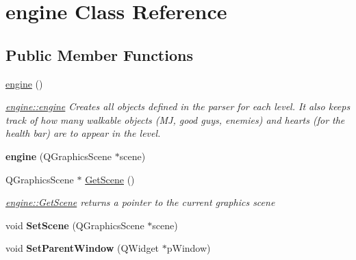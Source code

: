 \hypertarget{classengine}{\section{engine Class Reference}
\label{classengine}
}
\subsection*{Public Member Functions}
\begin{DoxyCompactItemize}
\item 
\hypertarget{classengine_aaffbfa4e20b4b627f2336eb6b40db348}{\hyperlink{classengine_aaffbfa4e20b4b627f2336eb6b40db348}{engine} ()}\label{classengine_aaffbfa4e20b4b627f2336eb6b40db348}

\begin{DoxyCompactList}\small\item\em \hyperlink{classengine_aaffbfa4e20b4b627f2336eb6b40db348}{engine\-::engine} Creates all objects defined in the parser for each level. It also keeps track of how many walkable objects (M\-J, good guys, enemies) and hearts (for the health bar) are to appear in the level. \end{DoxyCompactList}\item 
\hypertarget{classengine_a5fc1dc660b130df073d776e17f443ef5}{{\bfseries engine} (Q\-Graphics\-Scene $\ast$scene)}\label{classengine_a5fc1dc660b130df073d776e17f443ef5}

\item 
\hypertarget{classengine_aeaac5db377f37a85bfae53711e8248c0}{Q\-Graphics\-Scene $\ast$ \hyperlink{classengine_aeaac5db377f37a85bfae53711e8248c0}{Get\-Scene} ()}\label{classengine_aeaac5db377f37a85bfae53711e8248c0}

\begin{DoxyCompactList}\small\item\em \hyperlink{classengine_aeaac5db377f37a85bfae53711e8248c0}{engine\-::\-Get\-Scene} returns a pointer to the current graphics scene \end{DoxyCompactList}\item 
\hypertarget{classengine_a0421c21bd062075ab965333e05f20626}{void {\bfseries Set\-Scene} (Q\-Graphics\-Scene $\ast$scene)}\label{classengine_a0421c21bd062075ab965333e05f20626}

\item 
\hypertarget{classengine_ad0d2625e9b6f5b9ed18df6076001ea73}{void {\bfseries Set\-Parent\-Window} (Q\-Widget $\ast$p\-Window)}\label{classengine_ad0d2625e9b6f5b9ed18df6076001ea73}


\end{DoxyCompactItemize}
